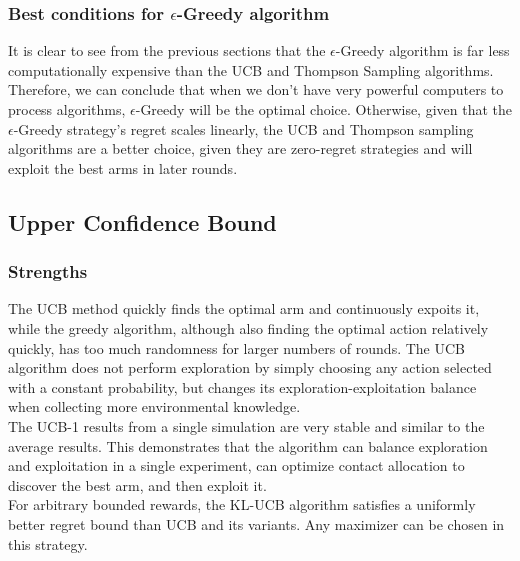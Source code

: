 \subsubsection{Best conditions for $\epsilon$-Greedy algorithm}
It is clear to see from the previous sections that the $\epsilon$-Greedy algorithm is far less computationally expensive than the UCB and Thompson Sampling algorithms.
Therefore, we can conclude that when we don't have very powerful computers to process algorithms, $\epsilon$-Greedy will be the optimal choice.
Otherwise, given that the $\epsilon$-Greedy strategy's regret scales linearly, the UCB and Thompson sampling algorithms are a better choice, given they are zero-regret strategies and will exploit the best arms in later rounds.

\subsection{Upper Confidence Bound}\label{subsec:upper-confidence-bound2}

\subsubsection{Strengths}
The UCB method quickly finds the optimal arm and continuously expoits it, while the greedy algorithm, although also finding the optimal action relatively quickly, has too much randomness for larger numbers of rounds.
The UCB algorithm does not perform exploration by simply choosing any action selected with a constant probability, but changes its exploration-exploitation balance when collecting more environmental knowledge.
\\The UCB-1 results from a single simulation are very stable and similar to the average results.
This demonstrates that the algorithm can balance exploration and exploitation in a single experiment, can optimize contact allocation to discover the best arm, and then exploit it.
\\ For arbitrary bounded rewards, the KL-UCB algorithm satisfies a uniformly better regret bound than UCB and its variants.
Any maximizer can be chosen in this strategy.\citep{Garivier2011}

